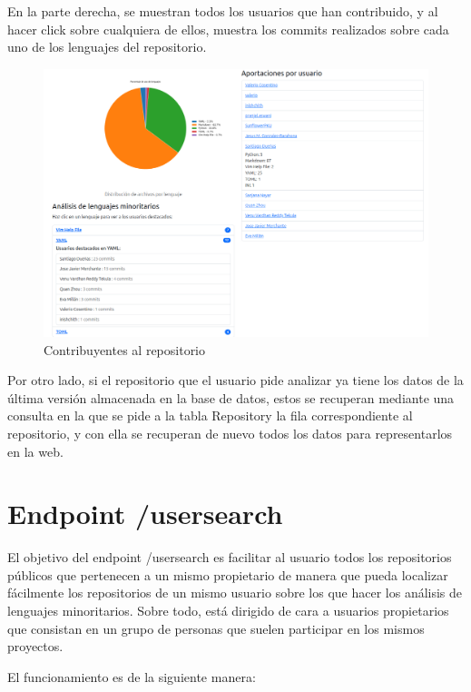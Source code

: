 \documentclass[a4paper, 12pt]{book}
\begin{document}
En la parte derecha, se muestran todos los usuarios que han contribuido, y al hacer click sobre cualquiera de ellos, muestra los commits realizados sobre cada uno de los lenguajes del repositorio.
\begin{figure}[H]
  \centering
  \includegraphics[width=1\textwidth]{img/resultado3userrepo.png}
  \caption{Contribuyentes al repositorio}
  \label{figura:resultuserrepo3}
\end{figure}
Por otro lado, si el repositorio que el usuario pide analizar ya tiene los datos de la última versión almacenada en la base de datos, estos se recuperan mediante una consulta en la que se pide a la tabla Repository la fila correspondiente al repositorio, y con ella se recuperan de nuevo todos los datos para representarlos en la web.

\section{Endpoint /usersearch}
\label{sec:/usersearch}

El objetivo del endpoint /usersearch es facilitar al usuario todos los repositorios públicos que pertenecen a un mismo propietario de manera que pueda localizar fácilmente los repositorios de un mismo usuario sobre los que hacer los análisis de lenguajes minoritarios. Sobre todo, está dirigido de cara a usuarios propietarios que consistan en un grupo de personas que suelen participar en los mismos proyectos.

El funcionamiento es de la siguiente manera:
\end{document}
